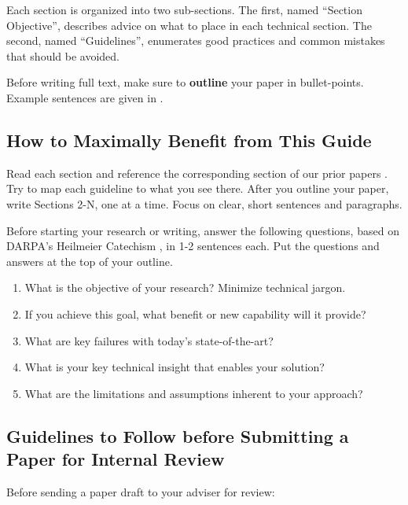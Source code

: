 Each section is organized into two sub-sections.
The first, named ``Section Objective'', describes advice on what to place in each technical section. The second, named ``Guidelines'', enumerates good practices and common mistakes that should be avoided.

Before writing full text, make sure to \textbf{outline} your paper in bullet-points.
Example sentences are given in .

\subsection{How to Maximally Benefit from This Guide}
Read each section and reference the corresponding section of our prior papers \cite{chinchali2021network,nakanoya2021task,ChinchaliSharmaEtAl2019}.
Try to map each guideline to what you see there. After you outline your paper, write Sections 2-N, one at a time. 
Focus on clear, short sentences and paragraphs. 

Before starting your research or writing, answer the following questions, based on DARPA's Heilmeier Catechism \cite{darpa}, in 1-2 sentences each. Put the questions and answers at the top of your outline.

\begin{enumerate}

\item What is the objective of your research? Minimize technical jargon.

\item If you achieve this goal, what benefit or new capability will it provide?

\item What are key failures with today's state-of-the-art?

\item What is your key technical insight that enables your solution?

\item What are the limitations and assumptions inherent to your approach?

\end{enumerate}


\subsection{Guidelines to Follow before Submitting a Paper for Internal Review}

Before sending a paper draft to your adviser for review:

